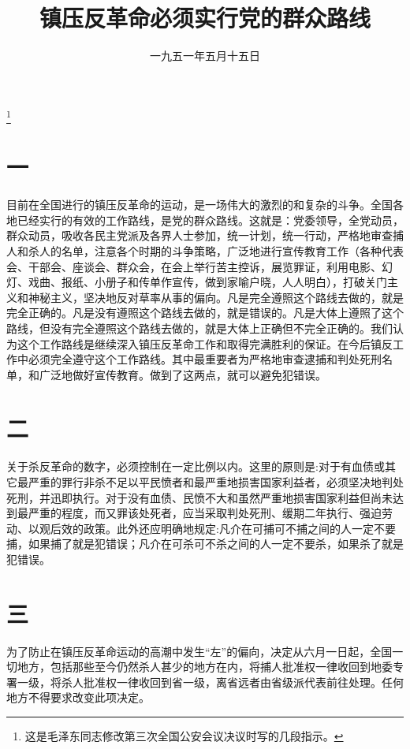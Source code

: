 
\title{镇压反革命必须实行党的群众路线}
\date{一九五一年五月十五日}
\thanks{这是毛泽东同志修改第三次全国公安会议决议时写的几段指示。}
\maketitle


\section*{一}

目前在全国进行的镇压反革命的运动，是一场伟大的激烈的和复杂的斗争。全国各地已经实行的有效的工作路线，是党的群众路线。这就是：党委领导，全党动员，群众动员，吸收各民主党派及各界人士参加，统一计划，统一行动，严格地审查捕人和杀人的名单，注意各个时期的斗争策略，广泛地进行宣传教育工作（各种代表会、干部会、座谈会、群众会，在会上举行苦主控诉，展览罪证，利用电影、幻灯、戏曲、报纸、小册子和传单作宣传，做到家喻户晓，人人明白），打破关门主义和神秘主义，坚决地反对草率从事的偏向。凡是完全遵照这个路线去做的，就是完全正确的。凡是没有遵照这个路线去做的，就是错误的。凡是大体上遵照了这个路线，但没有完全遵照这个路线去做的，就是大体上正确但不完全正确的。我们认为这个工作路线是继续深入镇压反革命工作和取得完满胜利的保证。在今后镇反工作中必须完全遵守这个工作路线。其中最重要者为严格地审查逮捕和判处死刑名单，和广泛地做好宣传教育。做到了这两点，就可以避免犯错误。

\section*{二}

关于杀反革命的数字，必须控制在一定比例以内。这里的原则是:对于有血债或其它最严重的罪行非杀不足以平民愤者和最严重地损害国家利益者，必须坚决地判处死刑，并迅即执行。对于没有血债、民愤不大和虽然严重地损害国家利益但尚未达到最严重的程度，而又罪该处死者，应当采取判处死刑、缓期二年执行、强迫劳动、以观后效的政策。此外还应明确地规定:凡介在可捕可不捕之间的人一定不要捕，如果捕了就是犯错误；凡介在可杀可不杀之间的人一定不要杀，如果杀了就是犯错误。

\section*{三}

为了防止在镇压反革命运动的高潮中发生“左”的偏向，决定从六月一日起，全国一切地方，包括那些至今仍然杀人甚少的地方在内，将捕人批准权一律收回到地委专署一级，将杀人批准权一律收回到省一级，离省远者由省级派代表前往处理。任何地方不得要求改变此项决定。

